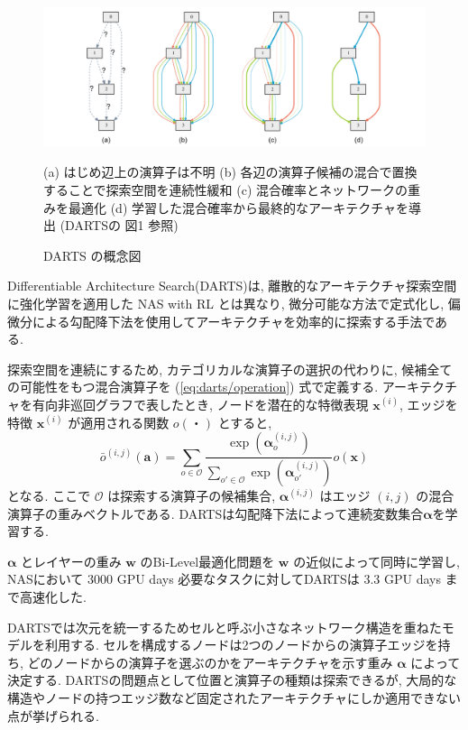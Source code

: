 \begin{figure}[t]
  \begin{center}
    \includegraphics[clip,width=15cm]{./fig/02.tech/darts.png}
  \end{center}
  \caption{DARTS の概念図}
  (a) はじめ辺上の演算子は不明 (b) 各辺の演算子候補の混合で置換することで探索空間を連続性緩和 (c) 混合確率とネットワークの重みを最適化 (d) 学習した混合確率から最終的なアーキテクチャを導出
  (DARTS\cite{DBLP:journals/corr/abs-1806-09055}の 図1 参照)
  \label{fig:darts}
\end{figure}

Differentiable Architecture Search(DARTS)\cite{DBLP:journals/corr/abs-1806-09055}は,
離散的なアーキテクチャ探索空間に強化学習を適用した NAS with RL とは異なり,
微分可能な方法で定式化し\cite{Paszke2017AutomaticDI},
偏微分による勾配降下法を使用してアーキテクチャを効率的に探索する手法である.

探索空間を連続にするため, カテゴリカルな演算子の選択の代わりに, 候補全ての可能性をもつ混合演算子を
(\ref{eq:darts/operation}) 式で定義する.
アーキテクチャを有向非巡回グラフで表したとき, ノードを潜在的な特徴表現 $\bm{x}^{(i)}$,
エッジを特徴 $\bm{x}^{(i)}$ が適用される関数 $o(・)$ とすると,
\begin{equation}
  \label{eq:darts/operation}
  \bar{o}^{(i, j)}(\bm{a}) = \sum_{o \in \mathcal{O}} \frac{\exp(\bm{\alpha}^{(i, j)}_o)}{\sum_{o' \in \mathcal{O}} \exp(\bm{\alpha}^{(i, j)}_{o'})} o(\bm{x})
\end{equation}
となる. ここで
$\mathcal{O}$ は探索する演算子の候補集合,
$\bm{\alpha}^{(i, j)}$ はエッジ $(i, j)$ の混合演算子の重みベクトルである.
DARTSは勾配降下法によって連続変数集合$\bm{\alpha}$を学習する.

$\bm{\alpha}$ とレイヤーの重み $\bm{w}$ のBi-Level最適化問題\cite{Colson2007AnOO}を
$\bm{w}$ の近似によって同時に学習し,
NASにおいて 3000 GPU days 必要なタスクに対してDARTSは 3.3 GPU days まで高速化した.

DARTSでは次元を統一するためセルと呼ぶ小さなネットワーク構造を重ねたモデルを利用する.
セルを構成するノードは2つのノードからの演算子エッジを持ち,
どのノードからの演算子を選ぶのかをアーキテクチャを示す重み $\bm{\alpha}$ によって決定する.
DARTSの問題点として位置と演算子の種類は探索できるが,
大局的な構造やノードの持つエッジ数など固定されたアーキテクチャにしか適用できない点が挙げられる.


